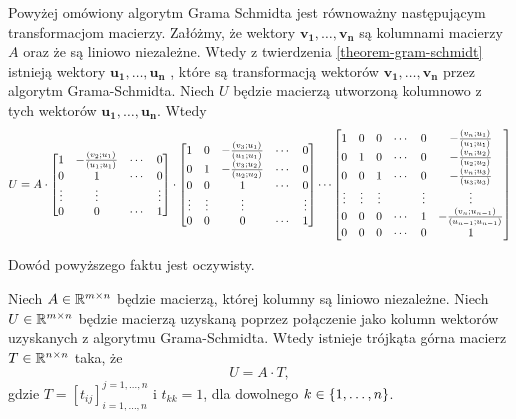 \documentclass[12pt,a4paper]{report}
\newcommand{\vr}[1]{\mathbf{#1}}
\newcommand{\mx}[1]{{#1}}
\newcommand{\proj}[2]{\frac{\scalar{#2}{#1}}{\scalar{#1}{#1}}}
\begin{document}
\begin{lemma} \label{lemma-matrix-formulation-of-gs}
Powyżej omówiony algorytm Grama Schmidta jest równoważny następującym transformacjom macierzy. Załóżmy, że wektory $\vr{v_1}, \ldots, \vr{v_n}$ są kolumnami macierzy $\mx{A}$ oraz że są liniowo niezależne. Wtedy z twierdzenia \ref{theorem-gram-schmidt} istnieją wektory $\vr{u_1}, \ldots, \vr{u_n}$ , które są transformacją wektorów $\vr{v_1}, \ldots, \vr{v_n}$ przez algorytm Grama-Schmidta. Niech $\mx{U}$ będzie macierzą utworzoną kolumnowo z tych wektorów $\vr{u_1}, \ldots, \vr{u_n}$. Wtedy
{\small
$$
U = A \cdot 
\begin{bmatrix}
1 & -\proj{u_1}{v_2} & \cdots & 0 \\
0 & 1 & \cdots & 0 \\
\vdots & \vdots & & \vdots \\
0 & 0 & \cdots & 1
\end{bmatrix} \cdot
\begin{bmatrix}
1 & 0 & -\proj{u_1}{v_3} &\cdots & 0 \\
0 & 1 & -\proj{u_2}{v_3} &\cdots & 0 \\
0 & 0 & 1 & \cdots & 0 \\
\vdots & \vdots & \vdots &  & \vdots \\
0 & 0 & 0 & \cdots & 1
\end{bmatrix}
 \cdots
\begin{bmatrix}
1 & 0 & 0 & \cdots & 0 & -\proj{u_1}{v_n} \\
0 & 1 & 0 & \cdots & 0 &-\proj{u_2}{v_n} \\
0 & 0 & 1 & \cdots & 0 & -\proj{u_3}{v_n} \\
\vdots & \vdots & \vdots &  & \vdots & \vdots \\
0 & 0 & 0 & \cdots & 1 & -\proj{u_{n-1}}{v_n} \\
0 & 0 & 0 & \cdots & 0 & 1
\end{bmatrix}
$$ 
}
\end{lemma}

Dowód powyższego faktu jest oczywisty. 



\begin{lemma}\label{lemma-gram-schmidt-matrix}
Niech $\mx{A} \in \setR^{m \times n}$ będzie macierzą, której kolumny są liniowo niezależne. Niech $\mx{U} \in \setR^{m \times n}$ będzie macierzą uzyskaną poprzez połączenie jako kolumn wektorów uzyskanych z algorytmu Grama-Schmidta. Wtedy istnieje trójkąta górna macierz $\mx{T} \in \setR^{n \times n}$ taka, że
$$
\mx{U} = \mx{A} \cdot \mx{T},
$$
gdzie $\mx{T} = [t_{ij}]_{i = 1, \ldots , n}^{j = 1, \ldots, n}$ i $t_{kk} = 1$, dla dowolnego $k \in \left\lbrace {1,\ldots,n} \right\rbrace$.
\end{lemma}
\end{document}

